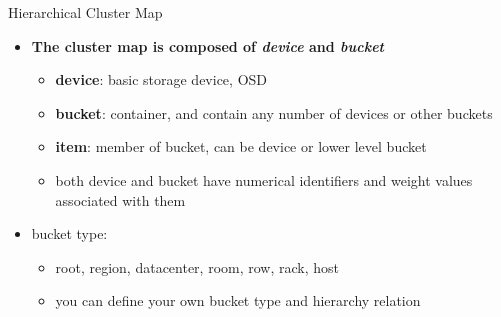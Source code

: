 \begin{frame}{Hierarchical Cluster Map}
    \begin{itemize}
        \item \textbf{The cluster map is composed of \textit{device} and \textit{bucket}}
        \begin{itemize}
            \item \textbf{device}: basic storage device, OSD
            \item \textbf{bucket}: container, and contain any number of devices or other buckets
            \item \textbf{item}: member of bucket, can be device or lower level bucket
            \item both device and bucket have numerical identifiers and weight values associated with them
        \end{itemize}
        \item bucket type:
            \begin{itemize}
                \item root, region, datacenter, room, row, rack, host
                \item you can define your own bucket type and hierarchy relation
            \end{itemize}
    \end{itemize}
\end{frame}

